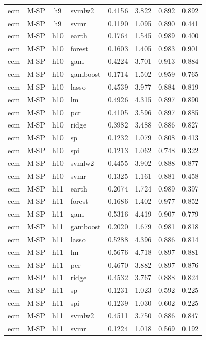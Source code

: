 \begin{ThreePartTable}
\begin{longtable}[t]{llclcccc}
ecm & M-SP & h9 & svmlw2 & 0.4156 & 3.822 & 0.892 & 0.892\\
ecm & M-SP & h9 & svmr & 0.1190 & 1.095 & 0.890 & 0.441\\
\addlinespace
ecm & M-SP & h10 & earth & 0.1764 & 1.545 & 0.989 & 0.400\\
ecm & M-SP & h10 & forest & 0.1603 & 1.405 & 0.983 & 0.901\\
ecm & M-SP & h10 & gam & 0.4224 & 3.701 & 0.913 & 0.884\\
ecm & M-SP & h10 & gamboost & 0.1714 & 1.502 & 0.959 & 0.765\\
ecm & M-SP & h10 & lasso & 0.4539 & 3.977 & 0.884 & 0.819\\
ecm & M-SP & h10 & lm & 0.4926 & 4.315 & 0.897 & 0.890\\
ecm & M-SP & h10 & pcr & 0.4105 & 3.596 & 0.897 & 0.885\\
ecm & M-SP & h10 & ridge & 0.3982 & 3.488 & 0.886 & 0.827\\
ecm & M-SP & h10 & sp & 0.1232 & 1.079 & 0.808 & 0.413\\
ecm & M-SP & h10 & spi & 0.1213 & 1.062 & 0.748 & 0.322\\
ecm & M-SP & h10 & svmlw2 & 0.4455 & 3.902 & 0.888 & 0.877\\
ecm & M-SP & h10 & svmr & 0.1325 & 1.161 & 0.881 & 0.458\\
\addlinespace
ecm & M-SP & h11 & earth & 0.2074 & 1.724 & 0.989 & 0.397\\
ecm & M-SP & h11 & forest & 0.1686 & 1.402 & 0.977 & 0.852\\
ecm & M-SP & h11 & gam & 0.5316 & 4.419 & 0.907 & 0.779\\
ecm & M-SP & h11 & gamboost & 0.2020 & 1.679 & 0.981 & 0.818\\
ecm & M-SP & h11 & lasso & 0.5288 & 4.396 & 0.886 & 0.814\\
ecm & M-SP & h11 & lm & 0.5676 & 4.718 & 0.897 & 0.881\\
ecm & M-SP & h11 & pcr & 0.4670 & 3.882 & 0.897 & 0.876\\
ecm & M-SP & h11 & ridge & 0.4532 & 3.767 & 0.888 & 0.824\\
ecm & M-SP & h11 & sp & 0.1231 & 1.023 & 0.592 & 0.225\\
ecm & M-SP & h11 & spi & 0.1239 & 1.030 & 0.602 & 0.225\\
ecm & M-SP & h11 & svmlw2 & 0.4511 & 3.750 & 0.886 & 0.847\\
ecm & M-SP & h11 & svmr & 0.1224 & 1.018 & 0.569 & 0.192\\

\end{longtable}
\end{ThreePartTable}
